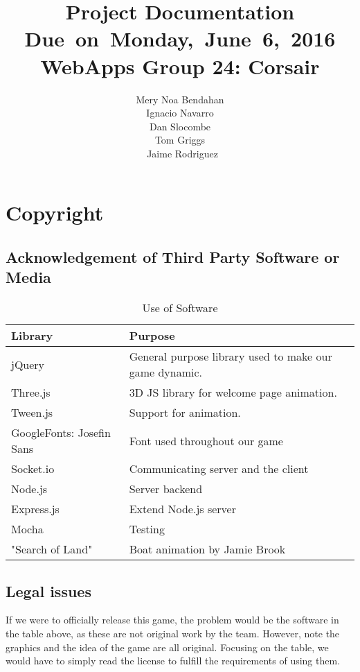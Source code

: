 \documentclass{article}
\title{
\vspace{2in}
\textmd{\textbf{Project Documentation}}\\
\normalsize\vspace{0.1in}\small{Due\ on\ Monday,\ June\ 6,\ 2016}\\
\vspace{0.1in}\large{\textbf{WebApps Group 24: Corsair}}
\vspace{3in}
}
\author{Mery Noa Bendahan \\ Ignacio Navarro \\ Dan Slocombe \\ Tom Griggs \\ Jaime Rodriguez}
\date{}
\renewcommand{\_}{\char`_}
\begin{document}
\section{Copyright}

\subsection{Acknowledgement of Third Party Software or Media}

\begin{table}[H]
\centering
\caption{Use of Software}
\label{my-label}
\begin{tabular}{|l|l|}
\hline
\textbf{Library}         & \textbf{Purpose}                                        \\ \hline
jQuery                    & General purpose library used to make our game dynamic. \\ \hline
Three.js                  & 3D JS library for welcome page animation.              \\ \hline
Tween.js                  & Support for animation.                                 \\ \hline
GoogleFonts: Josefin Sans & Font used throughout our game                          \\ \hline
Socket.io                 & Communicating server and the client                    \\ \hline
Node.js                   & Server backend                                         \\ \hline
Express.js                & Extend Node.js server                                  \\ \hline
Mocha                     & Testing                                                \\ \hline
"Search of Land"          & Boat animation by Jamie Brook                               \\ \hline
\end{tabular}
\end{table}

\subsection{Legal issues}
If we were to officially release this game, the problem would be the software in the table above,
as these are not original work by the team. However, note the graphics and the idea of the game are all original. Focusing on the table, we would have to simply read the license to fulfill the requirements of using them.
\end{document}
